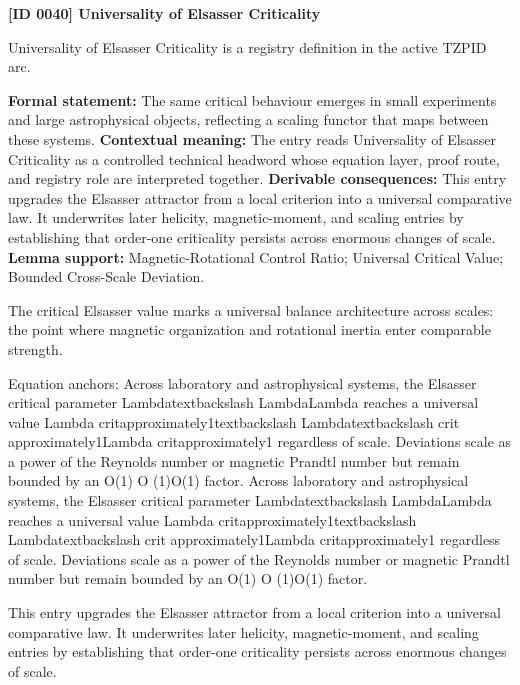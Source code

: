 \clearpage
\noindent\textbf{[ID 0040] Universality of Elsasser Criticality}\par
\vspace{0.35em}
\begingroup\small
{}
Universality of Elsasser Criticality is a registry definition in the active TZPID arc.

\begingroup\footnotesize\setlength{\emergencystretch}{3em}\sloppy
\textbf{Formal statement:} The same critical behaviour emerges in small experiments and large astrophysical objects, reflecting a scaling functor that maps between these systems. \textbf{Contextual meaning:} The entry reads Universality of Elsasser Criticality as a controlled technical headword whose equation layer, proof route, and registry role are interpreted together. \textbf{Derivable consequences:} This entry upgrades the Elsasser attractor from a local criterion into a universal comparative law. It underwrites later helicity, magnetic-moment, and scaling entries by establishing that order-one criticality persists across enormous changes of scale. \textbf{Lemma support:} Magnetic-Rotational Control Ratio; Universal Critical Value; Bounded Cross-Scale Deviation.\par
\endgroup

The critical Elsasser value marks a universal balance architecture across scales: the point where magnetic organization and rotational inertia enter comparable strength.

Equation anchors: Across laboratory and astrophysical systems, the Elsasser critical parameter Lambdatextbackslash LambdaLambda reaches a universal value Lambda critapproximately1textbackslash Lambdatextbackslash crit approximately1Lambda critapproximately1 regardless of scale. Deviations scale as a power of the Reynolds number or magnetic Prandtl number but remain bounded by an O(1) O (1)O(1) factor. Across laboratory and astrophysical systems, the Elsasser critical parameter Lambdatextbackslash LambdaLambda reaches a universal value Lambda critapproximately1textbackslash Lambdatextbackslash crit approximately1Lambda critapproximately1 regardless of scale. Deviations scale as a power of the Reynolds number or magnetic Prandtl number but remain bounded by an O(1) O (1)O(1) factor.

This entry upgrades the Elsasser attractor from a local criterion into a universal comparative law. It underwrites later helicity, magnetic-moment, and scaling entries by establishing that order-one criticality persists across enormous changes of scale.
\endgroup

